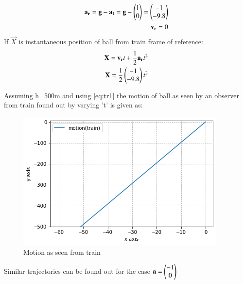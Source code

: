 \documentclass[journal,12pt,twocolumn]{IEEEtran}
\begin{document}
\begin{align}
    \mathbf{a_r}=\mathbf{g}-\mathbf{a_t}=\mathbf{g}-\begin{pmatrix}1\\0\end{pmatrix}=\begin{pmatrix}-1\\-9.8\end{pmatrix}\\
    \mathbf{v_r}=0
\end{align}
If $\vec{X}$ is instantaneous position of ball from train frame of reference:
\begin{align}
    \mathbf{X}=\mathbf{v_r}t+\frac{1}{2}\mathbf{a_r}t^2\\
    \mathbf{X}=\frac{1}{2}\begin{pmatrix}-1\\-9.8\end{pmatrix}t^2\label{eq:tr2}
\end{align}

Assuming h=500m and using \eqref{eq:tr1} the motion of ball as seen by an observer from train found out by  varying 't' is given as:
\begin{figure}[!ht]
\centering
\includegraphics[width=\columnwidth]{figure7_2}
\caption{Motion as seen from train }
\label{fig:vectors}	
\end{figure}
\linebreak Similar trajectories can be found out for the case $\mathbf{a}=\begin{pmatrix}-1\\0\end{pmatrix}$
\end{document}
